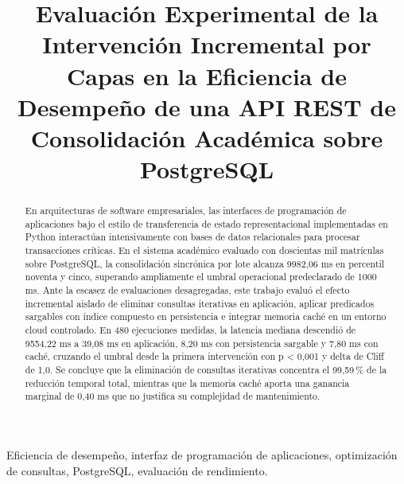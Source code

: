 \documentclass[conference]{IEEEtran}
\begin{document}
\title{Evaluación Experimental de la Intervención Incremental por Capas en la Eficiencia de Desempeño de una API REST de Consolidación Académica sobre PostgreSQL}

\author{
}

\maketitle

\begin{abstract}
En arquitecturas de software empresariales, las interfaces de programación de aplicaciones bajo el estilo de transferencia de estado representacional implementadas en Python interactúan intensivamente con bases de datos relacionales para procesar transacciones críticas. En el sistema académico evaluado con doscientas mil matrículas sobre PostgreSQL, la consolidación sincrónica por lote alcanza 9982,06 ms en percentil noventa y cinco, superando ampliamente el umbral operacional predeclarado de 1000 ms. Ante la escasez de evaluaciones desagregadas, este trabajo evaluó el efecto incremental aislado de eliminar consultas iterativas en aplicación, aplicar predicados sargables con índice compuesto en persistencia e integrar memoria caché en un entorno cloud controlado. En 480 ejecuciones medidas, la latencia mediana descendió de 9554,22 ms a 39,08 ms en aplicación, 8,20 ms con persistencia sargable y 7,80 ms con caché, cruzando el umbral desde la primera intervención con p < 0,001 y delta de Cliff de 1,0. Se concluye que la eliminación de consultas iterativas concentra el 99,59\,\% de la reducción temporal total, mientras que la memoria caché aporta una ganancia marginal de 0,40 ms que no justifica su complejidad de mantenimiento.
\end{abstract}

\begin{IEEEkeywords}
Eficiencia de desempeño, interfaz de programación de aplicaciones, optimización de consultas, PostgreSQL, evaluación de rendimiento.
\end{IEEEkeywords}
\end{document}
